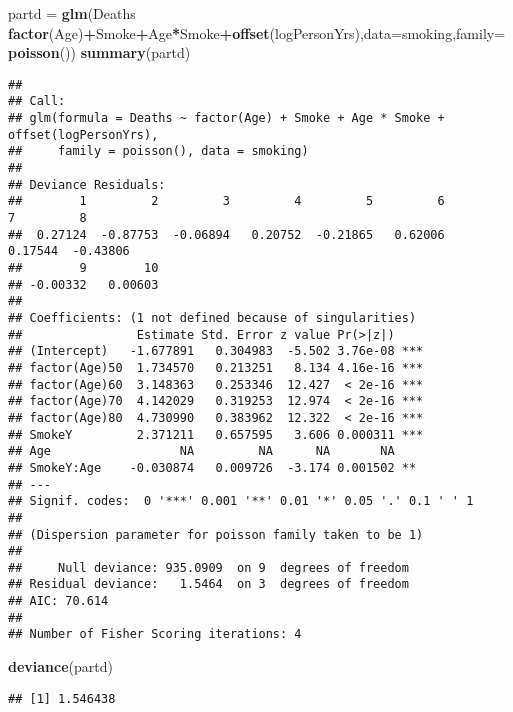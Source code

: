 \documentclass[
]{article}
\newenvironment{Shaded}{\begin{snugshade}}{\end{snugshade}}
\newcommand{\DataTypeTok}[1]{\textcolor[rgb]{0.13,0.29,0.53}{#1}}
\newcommand{\KeywordTok}[1]{\textcolor[rgb]{0.13,0.29,0.53}{\textbf{#1}}}
\newcommand{\NormalTok}[1]{#1}
\newcommand{\OperatorTok}[1]{\textcolor[rgb]{0.81,0.36,0.00}{\textbf{#1}}}
\newcommand{\StringTok}[1]{\textcolor[rgb]{0.31,0.60,0.02}{#1}}
\begin{document}
\begin{Shaded}
\begin{Highlighting}[]
\NormalTok{partd =}\StringTok{ }\KeywordTok{glm}\NormalTok{(Deaths }\OperatorTok{~}\StringTok{ }\KeywordTok{factor}\NormalTok{(Age)}\OperatorTok{+}\NormalTok{Smoke}\OperatorTok{+}\NormalTok{Age}\OperatorTok{*}\NormalTok{Smoke}\OperatorTok{+}\KeywordTok{offset}\NormalTok{(logPersonYrs),}\DataTypeTok{data=}\NormalTok{smoking,}\DataTypeTok{family=}\KeywordTok{poisson}\NormalTok{())}
\KeywordTok{summary}\NormalTok{(partd)}
\end{Highlighting}
\end{Shaded}

\begin{verbatim}
## 
## Call:
## glm(formula = Deaths ~ factor(Age) + Smoke + Age * Smoke + offset(logPersonYrs), 
##     family = poisson(), data = smoking)
## 
## Deviance Residuals: 
##        1         2         3         4         5         6         7         8  
##  0.27124  -0.87753  -0.06894   0.20752  -0.21865   0.62006   0.17544  -0.43806  
##        9        10  
## -0.00332   0.00603  
## 
## Coefficients: (1 not defined because of singularities)
##                Estimate Std. Error z value Pr(>|z|)    
## (Intercept)   -1.677891   0.304983  -5.502 3.76e-08 ***
## factor(Age)50  1.734570   0.213251   8.134 4.16e-16 ***
## factor(Age)60  3.148363   0.253346  12.427  < 2e-16 ***
## factor(Age)70  4.142029   0.319253  12.974  < 2e-16 ***
## factor(Age)80  4.730990   0.383962  12.322  < 2e-16 ***
## SmokeY         2.371211   0.657595   3.606 0.000311 ***
## Age                  NA         NA      NA       NA    
## SmokeY:Age    -0.030874   0.009726  -3.174 0.001502 ** 
## ---
## Signif. codes:  0 '***' 0.001 '**' 0.01 '*' 0.05 '.' 0.1 ' ' 1
## 
## (Dispersion parameter for poisson family taken to be 1)
## 
##     Null deviance: 935.0909  on 9  degrees of freedom
## Residual deviance:   1.5464  on 3  degrees of freedom
## AIC: 70.614
## 
## Number of Fisher Scoring iterations: 4
\end{verbatim}

\begin{Shaded}
\begin{Highlighting}[]
\KeywordTok{deviance}\NormalTok{(partd)}
\end{Highlighting}
\end{Shaded}

\begin{verbatim}
## [1] 1.546438
\end{verbatim}
\end{document}
